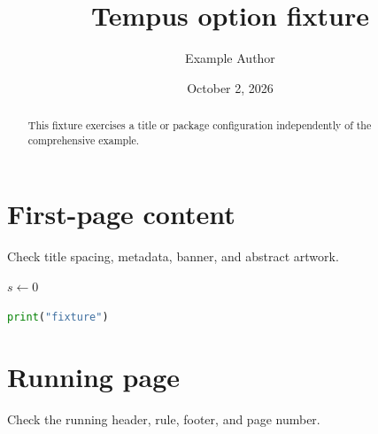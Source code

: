 \documentclass[algorithms,listings]{tempusreport}
\title{Tempus option fixture}
\author{Example Author}
\date{October 2, 2026}
\begin{document}
\maketitle
\begin{abstract}This fixture exercises a title or package configuration independently of the comprehensive example.\end{abstract}
\section{First-page content}
Check title spacing, metadata, banner, and abstract artwork.
\begin{algorithm}\caption{Fixture algorithm}\begin{algorithmic}[1]\State $s\gets0$\end{algorithmic}\end{algorithm}
\begin{lstlisting}[language=Python,caption={Fixture listing}]
print("fixture")
\end{lstlisting}

\clearpage\section{Running page}
Check the running header, rule, footer, and page number.
\end{document}
